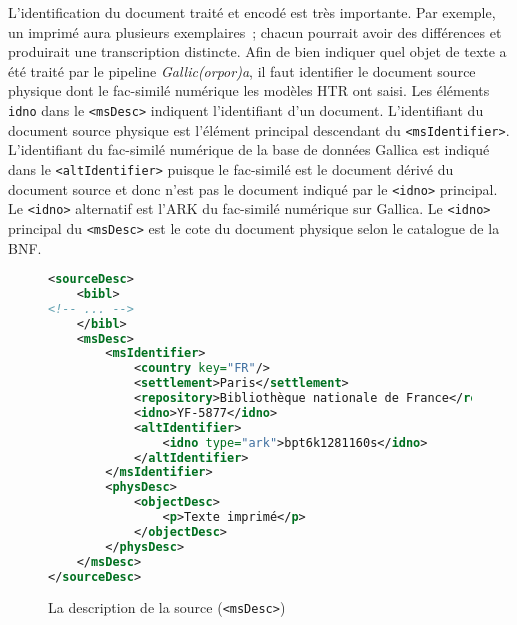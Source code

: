 \documentclass[class=article, crop=false]{standalone}
\begin{document}
L'identification du document traité et encodé est très importante. Par exemple, un imprimé aura plusieurs exemplaires~; chacun pourrait avoir des différences et produirait une transcription distincte. Afin de bien indiquer quel objet de texte a été traité par le pipeline \textit{Gallic(orpor)a}, il faut identifier le document source physique dont le fac-similé numérique les modèles \acrshort{HTR} ont saisi. Les éléments \texttt{idno} dans le \texttt{<msDesc>} indiquent l'identifiant d'un document. L'identifiant du document source physique est l'élément principal descendant du \texttt{<msIdentifier>}. L'identifiant du fac-similé numérique de la base de données Gallica est indiqué dans le \texttt{<altIdentifier>} puisque le fac-similé est le document dérivé du document source et donc n'est pas le document indiqué par le \texttt{<idno>} principal. Le \texttt{<idno>} alternatif est l'\acrshort{ARK} du fac-similé numérique sur Gallica. Le \texttt{<idno>} principal du \texttt{<msDesc>} est le cote du document physique selon le catalogue de la \acrlong{BNF}.


\begin{figure}[htp]
\centering
\begin{lstlisting}[language=XML]
<sourceDesc>
	<bibl>
<!-- ... -->
	</bibl>
	<msDesc>
		<msIdentifier>
			<country key="FR"/>
			<settlement>Paris</settlement>
			<repository>Bibliothèque nationale de France</repository>
			<idno>YF-5877</idno>
			<altIdentifier>
				<idno type="ark">bpt6k1281160s</idno>
			</altIdentifier>
		</msIdentifier>
		<physDesc>
			<objectDesc>
				<p>Texte imprimé</p>
			</objectDesc>
		</physDesc>
	</msDesc>
</sourceDesc>

\end{lstlisting}
\caption{La description de la source (\texttt{<msDesc>})}
\label{fig:msDesc}
\end{figure}
\end{document}
